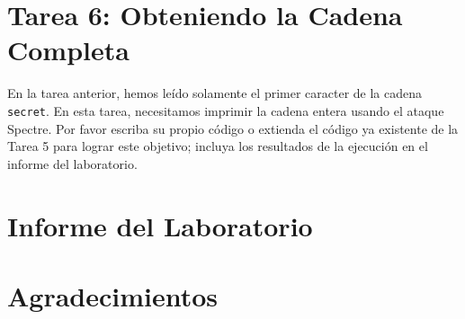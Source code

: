 \section{Tarea 6: Obteniendo la Cadena Completa}

En la tarea anterior, hemos leído solamente el primer caracter de la cadena \texttt{secret}. En esta tarea, necesitamos imprimir la cadena entera usando el ataque Spectre. Por favor escriba su propio código o extienda el código ya existente de la Tarea 5 para lograr este objetivo; incluya los resultados de la ejecución en el informe del laboratorio.

\section{Informe del Laboratorio}




\section*{Agradecimientos}






\def\baselinestretch{1}





